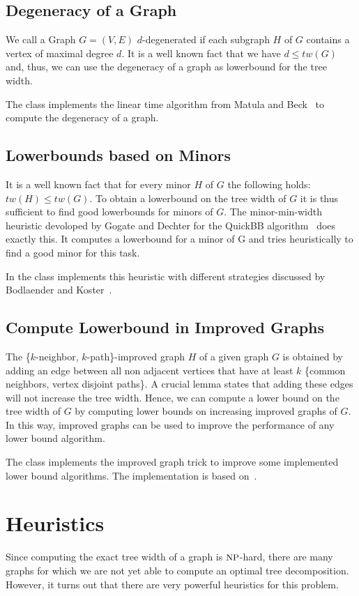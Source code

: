 \documentclass[a4paper, ukenglish, twoside, openright]{jdrasilmanual}
\begin{document}
\section{Degeneracy of a Graph}
We call a Graph $G=(V,E)$ $d$-degenerated if each subgraph $H$ of $G$ contains
a vertex of maximal degree $d$.  It is a well known fact that we have
\(d \le tw(G)\) and, thus, we can use the degeneracy of a graph as
lowerbound for the tree width.

The class  implements the linear time
algorithm from Matula and Beck~\cite{MatulaB1983} to compute the
degeneracy of a graph.

\section{Lowerbounds based on Minors}
It is a well known fact that for every minor $H$ of $G$ the following
holds: \(tw(H) \le tw(G)\). To obtain a lowerbound on the tree width
of $G$ it is thus sufficient to find good lowerbounds for minors of
$G$.  The minor-min-width heuristic devoloped by Gogate and Dechter
for the QuickBB algorithm~\cite{GogateD2004} does exactly this. It
computes a lowerbound for a minor of G and tries heuristically to find
a good minor for this task.

In \Jdrasil{} the class  implements
this heuristic with different strategies discussed by Bodlaender and Koster~\cite{bodleanderK2011}.

\section{Compute Lowerbound in Improved Graphs}
The \{$k$-neighbor, $k$-path\}-improved graph \(H\) of a given graph \(G\)
is obtained by adding an edge between all non adjacent vertices that
have at least $k$ \{common neighbors, vertex disjoint paths\}. A crucial
lemma states that adding these edges will not increase the tree
width. Hence, we can compute a lower bound on the tree width of \(G\)
by computing lower bounds on increasing improved graphs of \(G\). In
this way, improved graphs can be used to improve the performance of
any lower bound algorithm.

The class  implements the improved graph trick to improve some
implemented lower bound algorithms. The implementation is based on~\cite{bodleanderK2011}.

\chapter{Heuristics}
Since computing the exact tree width of a graph is
$\Class{NP}$-hard, there are many graphs for which we are not yet
able to compute an optimal tree decomposition. However, it turns out
that there are very powerful heuristics for this problem.
\end{document}
